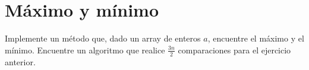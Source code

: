 \section{Máximo y mínimo}
Implemente un método que, dado un array de enteros \(a\), encuentre el máximo y el mínimo. Encuentre un algoritmo que realice \(\frac{3 n}{2}\) comparaciones para el ejercicio anterior.